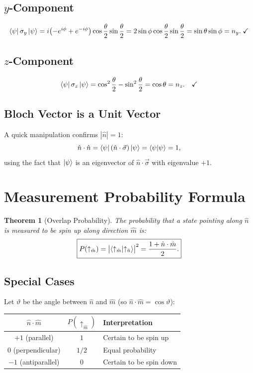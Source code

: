 \documentclass[11pt,a4paper]{article}
\theoremstyle{definition}
\theoremstyle{plain}
\newtheorem{theorem}{Theorem}[section]
\theoremstyle{remark}
\begin{document}
\subsection{$y$-Component}

\[
    \bra{\psi}\sigma_y\ket{\psi} = i\bigl(-e^{i\phi} + e^{-i\phi}\bigr)\cos\frac{\theta}{2}\sin\frac{\theta}{2} = 2\sin\phi\cos\frac{\theta}{2}\sin\frac{\theta}{2} = \sin\theta\sin\phi = n_y. \;\checkmark
\]

\subsection{$z$-Component}

\[
    \bra{\psi}\sigma_z\ket{\psi} = \cos^2\frac{\theta}{2} - \sin^2\frac{\theta}{2} = \cos\theta = n_z. \quad\checkmark
\]

\subsection{Bloch Vector is a Unit Vector}

A quick manipulation confirms $|\hat{n}| = 1$:
\[
    \hat{n}\cdot\hat{n} = \bra{\psi}(\hat{n}\cdot\vec{\sigma})\ket{\psi} = \bra{\psi}\ket{\psi} = 1,
\]
using the fact that $\ket{\psi}$ is an eigenvector of $\hat{n}\cdot\vec{\sigma}$ with eigenvalue $+1$.

\section{Measurement Probability Formula}

\begin{theorem}[Overlap Probability]
    The probability that a state pointing along $\hat{n}$ is measured to be spin up along direction $\hat{m}$ is:
    \[
        \boxed{P(\uparrow_{\hat{m}}) = \bigl|\braket{\uparrow_{\hat{m}}}{\uparrow_{\hat{n}}}\bigr|^2 = \frac{1 + \hat{n}\cdot\hat{m}}{2}.}
    \]
\end{theorem}

\subsection{Special Cases}

Let $\vartheta$ be the angle between $\hat{n}$ and $\hat{m}$ (so $\hat{n}\cdot\hat{m} = \cos\vartheta$):

\begin{center}
\renewcommand{\arraystretch}{1.4}
\begin{tabular}{c|c|l}
    $\hat{n}\cdot\hat{m}$ & $P(\uparrow_{\hat{m}})$ & Interpretation \\ \hline
    $+1$ (parallel) & $1$ & Certain to be spin up \\
    $0$ (perpendicular) & $1/2$ & Equal probability \\
    $-1$ (antiparallel) & $0$ & Certain to be spin down
\end{tabular}
\end{center}
\end{document}
